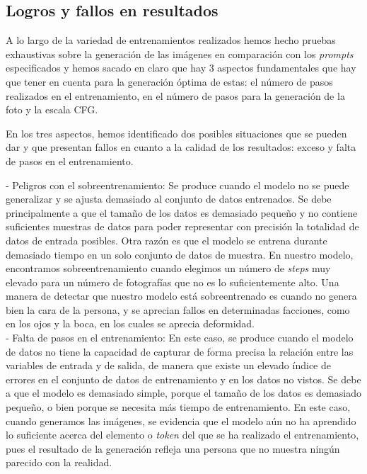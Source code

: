 \subsection{Logros y fallos en resultados}

A lo largo de la variedad de entrenamientos realizados hemos hecho pruebas exhaustivas sobre la generación de las imágenes en comparación con los \textit{prompts} especificados y hemos sacado en claro que hay 3 aspectos fundamentales que hay que tener en cuenta para la generación óptima de estas: el número de pasos realizados en el entrenamiento, en el número de pasos para la generación de la foto y la escala CFG. 

En los tres aspectos, hemos identificado dos posibles situaciones que se pueden dar y que presentan fallos en cuanto a la calidad de los resultados: exceso y falta de pasos en el entrenamiento. 


- Peligros con el sobreentrenamiento: Se produce cuando el modelo no se puede generalizar y se ajusta demasiado al conjunto de datos entrenados. Se debe principalmente a que el tamaño de los datos es demasiado pequeño y no contiene suficientes muestras de datos para poder representar con precisión la totalidad de datos de entrada posibles. Otra razón es que el modelo se entrena durante demasiado tiempo en un solo conjunto de datos de muestra. En nuestro modelo, encontramos sobreentrenamiento cuando elegimos un número de \textit{steps} muy elevado para un número de fotografías que no es lo suficientemente alto. Una manera de detectar que nuestro modelo está sobreentrenado es cuando no genera bien la cara de la persona, y se aprecian fallos en determinadas facciones, como en los ojos y la boca, en los cuales se aprecia deformidad.\\

- Falta de pasos en el entrenamiento: En este caso, se produce cuando el modelo de datos no tiene la capacidad de capturar de forma precisa la relación entre las variables de entrada y de salida, de manera que existe un elevado índice de errores en el conjunto de datos de entrenamiento y en los datos no vistos. Se debe a que el modelo es demasiado simple, porque el tamaño de los datos es demasiado pequeño, o bien porque se necesita más tiempo de entrenamiento. En este caso, cuando generamos las imágenes, se evidencia que el modelo aún no ha aprendido lo suficiente acerca del elemento o \textit{token} del que se ha realizado el entrenamiento, pues el resultado de la generación refleja una persona que no muestra ningún parecido con la realidad.\\


